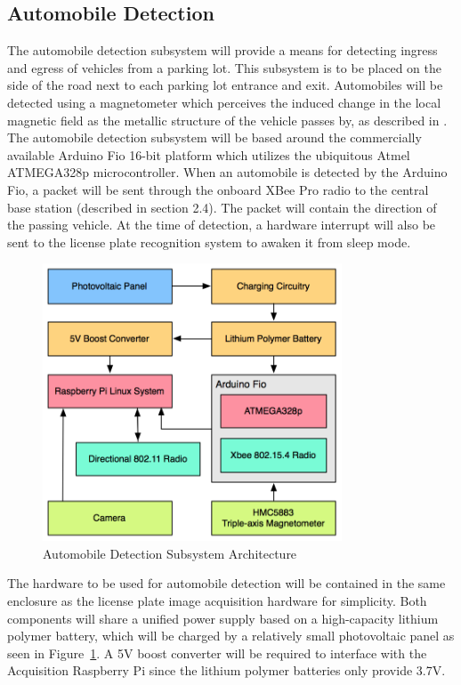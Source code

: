 \documentclass[11pt, oneside, fullpage, doublespace]{article}
\begin{document}
\subsection{Automobile Detection}
The automobile detection subsystem will provide a means for detecting ingress and egress of vehicles from a parking lot. This subsystem is to be placed on the side of the road next to each parking lot entrance and exit. Automobiles will be detected using a magnetometer which perceives the induced change in the local magnetic field as the metallic structure of the vehicle passes by, as described in \cite{stillwell2013}. The automobile detection subsystem will be based around the commercially available Arduino Fio 16-bit  platform which utilizes the ubiquitous Atmel ATMEGA328p microcontroller. When an automobile is detected by the Arduino Fio, a packet will be sent through the onboard XBee Pro radio to the central base station (described in section 2.4). The packet will  contain the direction of the passing vehicle. At the time of detection, a hardware interrupt will also be sent to the license plate recognition system to awaken it from sleep mode.

\begin{figure}
\begin{center}
\includegraphics[width=3.5in]{autodetection}
\end{center}
\caption{Automobile Detection Subsystem Architecture}
\label{fig:autodetect}
\end{figure}

The hardware to be used for automobile detection will be contained in the same enclosure as the license plate image acquisition hardware for simplicity. Both components will share a unified power supply based on a high-capacity lithium polymer battery, which will be charged by a relatively small photovoltaic panel as seen in Figure~\ref{fig:autodetect}. A 5V boost converter will be required to interface with the Acquisition Raspberry Pi since the lithium polymer batteries only provide 3.7V.
\end{document}
